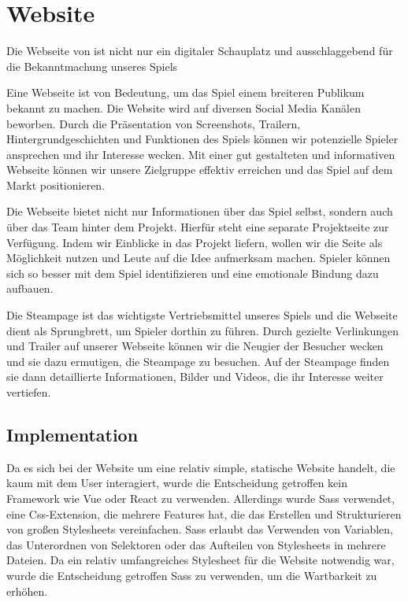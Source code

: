 
\section{Website}\label{sec:website}
\renewcommand{\kapitelautor}{Autor: Nils Hubmann}

%
Die Webseite von \ff ist nicht nur ein digitaler Schauplatz und ausschlaggebend für die Bekanntmachung unseres Spiels

Eine Webseite ist von Bedeutung, um das Spiel einem breiteren Publikum bekannt zu machen.
Die Website wird auf diversen Social Media Kanälen beworben.
Durch die Präsentation von Screenshots, Trailern, Hintergrundgeschichten und Funktionen des Spiels können wir potenzielle Spieler ansprechen und ihr Interesse wecken.
Mit einer gut gestalteten und informativen Webseite können wir unsere Zielgruppe effektiv erreichen und das Spiel auf dem Markt positionieren.

Die Webseite bietet nicht nur Informationen über das Spiel selbst, sondern auch über das Team hinter dem Projekt.
Hierfür steht eine separate Projektseite zur Verfügung.
Indem wir Einblicke in das Projekt liefern, wollen wir die Seite als Möglichkeit nutzen und Leute auf die Idee aufmerksam machen.
Spieler können sich so besser mit dem Spiel identifizieren und eine emotionale Bindung dazu aufbauen.

Die Steampage ist das wichtigste Vertriebsmittel unseres Spiels und die Webseite dient als Sprungbrett, um Spieler dorthin zu führen.
Durch gezielte Verlinkungen und Trailer auf unserer Webseite
können wir die Neugier der Besucher wecken und sie dazu ermutigen, die Steampage zu besuchen.
Auf der Steampage finden sie dann detaillierte Informationen, Bilder und Videos, die ihr Interesse weiter vertiefen.
%

\subsection{Implementation}
\renewcommand{\kapitelautor}{Autor: Marvin Kurka}

Da es sich bei der Website um eine relativ simple, statische Website handelt, die kaum mit dem User interagiert,
wurde die Entscheidung getroffen kein Framework wie \zB Vue oder React zu verwenden.
Allerdings wurde Sass verwendet, eine Css-Extension, die mehrere Features hat, die das Erstellen und Strukturieren
von großen Stylesheets vereinfachen.
Sass erlaubt \zB das Verwenden von Variablen, das Unterordnen von Selektoren oder das Aufteilen von
Stylesheets in mehrere Dateien.
Da ein relativ umfangreiches Stylesheet für die Website notwendig war, wurde die Entscheidung getroffen Sass zu
verwenden, um die Wartbarkeit zu erhöhen.

